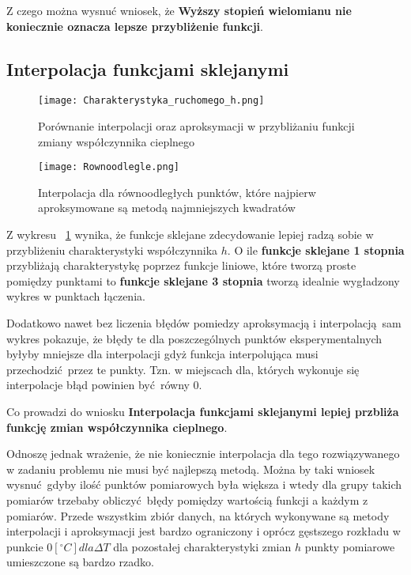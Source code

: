 \documentclass[varwidth,12pt,a4paper]{article}
\begin{document}
Z czego można wysnuć wniosek, że \textbf{Wyższy stopień wielomianu nie koniecznie oznacza lepsze przybliżenie funkcji}.

\subsection{Interpolacja funkcjami sklejanymi}

\begin{figure}[H]
    \texttt{[image: Charakterystyka\_ruchomego\_h.png]} 
    \caption{Porównanie interpolacji oraz aproksymacji w przybliżaniu funkcji zmiany współczynnika cieplnego}
    \label{fig:interpolacjaAproksymacja}
\end{figure}

\begin{figure}[H]
    \centering\texttt{[image: Rownoodlegle.png]} 
    \caption{Interpolacja dla równoodległych punktów, które najpierw aproksymowane są
    metodą najmniejszych kwadratów}
    \label{fig:interpolacjaRowne}
\end{figure}

Z wykresu ~\ref{fig:interpolacjaAproksymacja} wynika, że funkcje sklejane zdecydowanie lepiej radzą sobie w przybliżeniu charakterystyki
współczynnika $h$. O ile \textbf{funkcje sklejane 1 stopnia} przybliżają charakterystykę poprzez funkcje
liniowe, które tworzą proste pomiędzy punktami to \textbf{funkcje sklejane 3 stopnia} tworzą idealnie
wygładzony wykres w punktach łączenia.

Dodatkowo nawet bez liczenia błędów pomiedzy aproksymacją i interpolacją sam wykres pokazuje, że błędy te
dla poszczególnych punktów eksperymentalnych byłyby mniejsze dla interpolacji gdyż funkcja interpolująca musi 
przechodzić przez te punkty. Tzn. w miejscach dla, których wykonuje się interpolacje błąd powinien być równy $0$.

Co prowadzi do wniosku \textbf{Interpolacja funkcjami sklejanymi lepiej przbliża funkcję zmian współczynnika cieplnego}.

Odnoszę jednak wrażenie, że nie koniecznie interpolacja dla tego rozwiązywanego w zadaniu problemu nie musi być najlepszą metodą.
Można by taki wniosek wysnuć gdyby ilość punktów pomiarowych była większa i wtedy dla grupy takich pomiarów
trzebaby obliczyć błędy pomiędzy wartością funkcji a każdym z pomiarów. Przede wszystkim zbiór danych, na których
wykonywane są metody interpolacji i aproksymacji jest bardzo ograniczony i oprócz gęstszego rozkładu w punkcie
$0 [^\circ C] dla \Delta T$ dla pozostałej charakterystyki zmian $h$ punkty pomiarowe umieszczone są bardzo rzadko.
\end{document}
